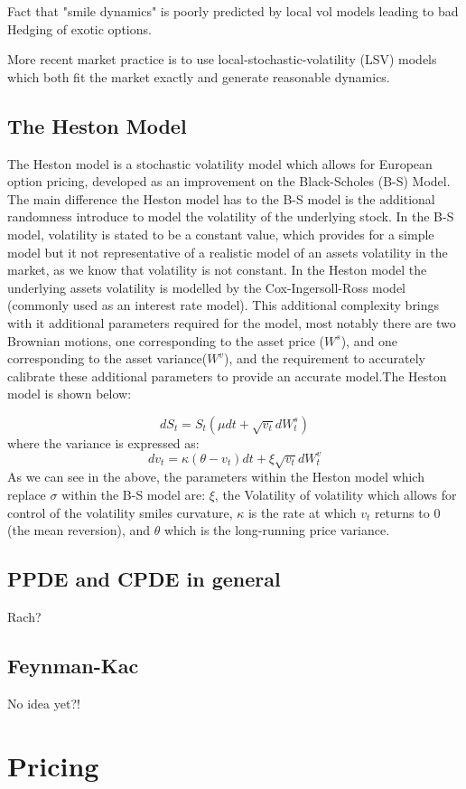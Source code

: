\documentclass[12pt,oneside]{article}
\begin{document}
Fact that "smile dynamics" is poorly predicted by local vol models leading to bad Hedging of exotic options.

More recent market practice is to use local-stochastic-volatility
(LSV) models which both fit the market exactly and generate reasonable
dynamics.




\subsection{The Heston Model}
The Heston model is a stochastic volatility model which allows for European option pricing, developed as an improvement on the Black-Scholes (B-S) Model. The main difference the Heston model has to the B-S model is the additional randomness introduce to model the volatility of the underlying stock. In the B-S model, volatility is stated to be a constant value, which provides for a simple model but it not representative of a realistic model of an assets volatility in the market, as we know that volatility is not constant. In the Heston model the underlying assets volatility is modelled by the Cox-Ingersoll-Ross model (commonly used as an interest rate model). This additional complexity brings with it additional parameters required for the model, most notably there are two Brownian motions, one corresponding to the asset price ($W^s$), and one corresponding to the asset variance($W^v$), and the requirement to accurately calibrate these additional parameters to provide an accurate model.The Heston model is shown below: 

$$dS_t= S_t(\mu dt + \sqrt{v_t} dW_t^{s})$$ where the variance is expressed as: $$dv_t = \kappa (\theta - v_t)dt + \xi\sqrt{v_t}dW_t^{v}$$
As we can see in the above, the parameters within the Heston model which replace $\sigma$ within the B-S model are: $\xi$, the Volatility of volatility which allows for control of the volatility smiles curvature, $\kappa$ is the rate at which $v_t$ returns to 0 (the mean reversion), and $\theta$ which is the long-running price variance. 
\subsection{PPDE and CPDE in general}
Rach?
\subsection{Feynman-Kac}
No idea yet?!

\section{Pricing}
\label{sec:pricing}
\end{document}

